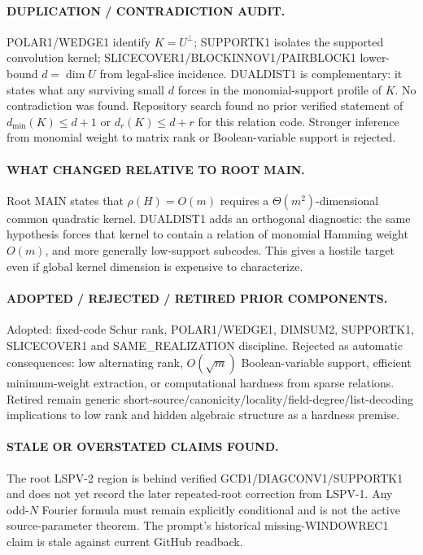 \documentclass[11pt]{article}
\begin{document}
\paragraph{DUPLICATION / CONTRADICTION AUDIT.}
POLAR1/WEDGE1 identify \(K=U^\perp\); SUPPORTK1 isolates the supported convolution kernel; SLICECOVER1/BLOCKINNOV1/PAIRBLOCK1 lower-bound \(d=\dim U\) from legal-slice incidence. DUALDIST1 is complementary: it states what any surviving small \(d\) forces in the monomial-support profile of \(K\). No contradiction was found. Repository search found no prior verified statement of \(d_{\min}(K)\le d+1\) or \(d_r(K)\le d+r\) for this relation code. Stronger inference from monomial weight to matrix rank or Boolean-variable support is rejected.

\paragraph{WHAT CHANGED RELATIVE TO ROOT MAIN.}
Root MAIN states that \(\rho(H)=O(m)\) requires a \(\Theta(m^2)\)-dimensional common quadratic kernel. DUALDIST1 adds an orthogonal diagnostic: the same hypothesis forces that kernel to contain a relation of monomial Hamming weight \(O(m)\), and more generally low-support subcodes. This gives a hostile target even if global kernel dimension is expensive to characterize.

\paragraph{ADOPTED / REJECTED / RETIRED PRIOR COMPONENTS.}
Adopted: fixed-code Schur rank, POLAR1/WEDGE1, DIMSUM2, SUPPORTK1, SLICECOVER1 and SAME\_REALIZATION discipline. Rejected as automatic consequences: low alternating rank, \(O(\sqrt m)\) Boolean-variable support, efficient minimum-weight extraction, or computational hardness from sparse relations. Retired remain generic short-source/canonicity/locality/field-degree/list-decoding implications to low rank and hidden algebraic structure as a hardness premise.

\paragraph{STALE OR OVERSTATED CLAIMS FOUND.}
The root LSPV-2 region is behind verified GCD1/DIAGCONV1/SUPPORTK1 and does not yet record the later repeated-root correction from LSPV-1. Any odd-\(N\) Fourier formula must remain explicitly conditional and is not the active source-parameter theorem. The prompt's historical missing-WINDOWREC1 claim is stale against current GitHub readback.
\end{document}
